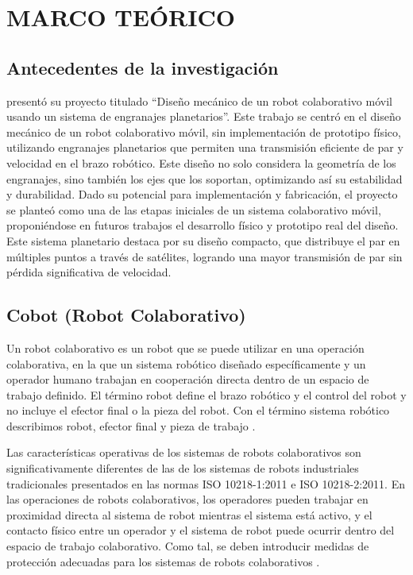 
\chapter{MARCO TEÓRICO}

\section{Antecedentes de la investigación}

\cite{delacruz2022} presentó su proyecto titulado ``Diseño mecánico de un robot colaborativo móvil usando un sistema de engranajes planetarios''. Este trabajo se centró en el diseño mecánico de un robot colaborativo móvil, sin implementación de prototipo físico, utilizando engranajes planetarios que permiten una transmisión eficiente de par y velocidad en el brazo robótico. Este diseño no solo considera la geometría de los engranajes, sino también los ejes que los soportan, optimizando así su estabilidad y durabilidad. Dado su potencial para implementación y fabricación, el proyecto se planteó como una de las etapas iniciales de un sistema colaborativo móvil, proponiéndose en futuros trabajos el desarrollo físico y prototipo real del diseño. Este sistema planetario destaca por su diseño compacto, que distribuye el par en múltiples puntos a través de satélites, logrando una mayor transmisión de par sin pérdida significativa de velocidad.

\section{Cobot (Robot Colaborativo)}

Un robot colaborativo es un robot que se puede utilizar en una operación colaborativa, en la que un sistema robótico diseñado específicamente y un operador humano trabajan en cooperación directa dentro de un espacio de trabajo definido. El término robot define el brazo robótico y el control del robot y no incluye el efector final o la pieza del robot. Con el término sistema robótico describimos robot, efector final y pieza de trabajo \cite{lenarcic2012}.

Las características operativas de los sistemas de robots colaborativos son significativamente diferentes de las de los sistemas de robots industriales tradicionales presentados en las normas ISO 10218-1:2011 e ISO 10218-2:2011. En las operaciones de robots colaborativos, los operadores pueden trabajar en proximidad directa al sistema de robot mientras el sistema está activo, y el contacto físico entre un operador y el sistema de robot puede ocurrir dentro del espacio de trabajo colaborativo. Como tal, se deben introducir medidas de protección adecuadas para los sistemas de robots colaborativos \cite{lenarcic2012}.

